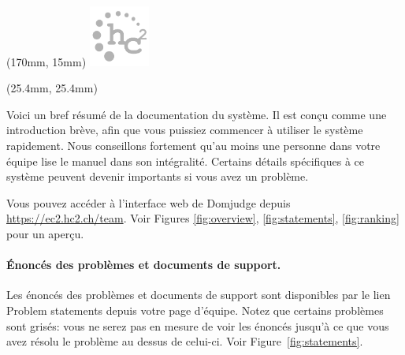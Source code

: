 \begin{textblock*}{20mm}(170mm, 15mm)
\includegraphics[width=20mm]{hc2logogray.pdf}
\end{textblock*}

\begin{textblock*}{50mm}(25.4mm, 25.4mm)
\noindent \textcolor{gray}{\langinfo \\ \textbf{\taskinfo} }
\end{textblock*}


\newcommand{\heveaonly}[1]{#1}
\renewcommand{\heveaonly}[1]{}

\noindent Voici un bref résumé de la documentation du système. Il est conçu comme une introduction brève, afin que vous
puissiez commencer à utiliser le système rapidement. Nous conseillons fortement qu'au moins une personne dans votre équipe
lise le manuel dans son intégralité. Certains détails spécifiques
à ce système peuvent devenir importants si vous avez un problème.

Vous pouvez accéder à l'interface web de Domjudge depuis
\url{https://ec2.hc2.ch/team}.
Voir Figures \ref{fig:overview}, \ref{fig:statements}, \ref{fig:ranking}
pour un aperçu.

\paragraph{Énoncés des problèmes et documents de support.}
Les énoncés des problèmes et documents de support sont 
disponibles par le lien \og Problem statements\fg{} depuis votre page d'équipe.
Notez que certains problèmes sont grisés: vous ne serez pas
en mesure de voir les énoncés jusqu'à ce que vous avez
résolu le problème au dessus de celui-ci.
Voir Figure~\ref{fig:statements}.

